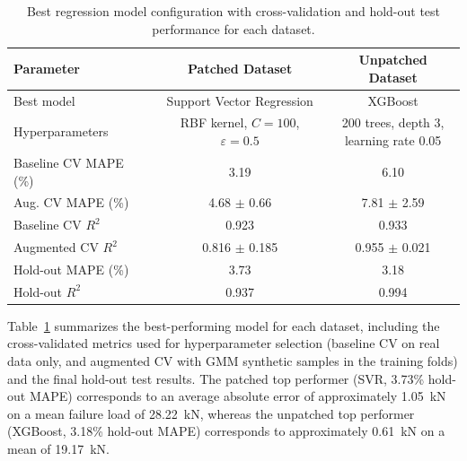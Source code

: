 \documentclass[journal,article,submit,pdftex,moreauthors]{Definitions/mdpi}
\begin{document}
\begin{table}[ht]
    \centering
    \caption{Best regression model configuration with cross-validation and hold-out test performance for each dataset.}
    \label{tab:model_summary}
\begin{tabular}{@{}lcc@{}}
\toprule
\textbf{Parameter} & \textbf{Patched Dataset} & \textbf{Unpatched Dataset} \\
\midrule
Best model & Support Vector Regression & XGBoost \\ \hline
 Hyperparameters & \makecell{RBF kernel, $C=100$,\\$\varepsilon=0.5$ }& \makecell{200 trees, depth 3,\\ learning rate 0.05 }\\
\midrule
Baseline CV MAPE (\%) & 3.19 & 6.10 \\
Aug. CV MAPE (\%) & 4.68 $\pm$ 0.66 & 7.81 $\pm$ 2.59 \\
Baseline CV $R^2$ & 0.923 & 0.933 \\
Augmented CV $R^2$ & 0.816 $\pm$ 0.185 & 0.955 $\pm$ 0.021 \\
\midrule
Hold-out MAPE (\%) & 3.73 & 3.18 \\
Hold-out $R^2$ & 0.937 & 0.994 \\
\bottomrule
\end{tabular}
\end{table}

Table~\ref{tab:model_summary} summarizes the best-performing model for each dataset, including the cross-validated metrics used for hyperparameter selection (baseline CV on real data only, and augmented CV with GMM synthetic samples in the training folds) and the final hold-out test results. The patched top performer (SVR, 3.73\% hold-out MAPE) corresponds to an average absolute error of approximately 1.05~kN on a mean failure load of 28.22~kN, whereas the unpatched top performer (XGBoost, 3.18\% hold-out MAPE) corresponds to approximately 0.61~kN on a mean of 19.17~kN.
\end{document}
